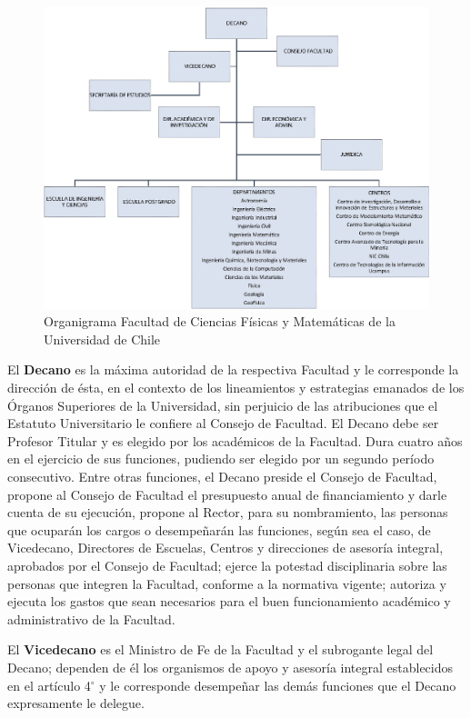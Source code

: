 \begin{figure}[ht!]
\centering
\includegraphics[width=\columnwidth]{./organigramas/organigrama_fcfm.eps}
\caption{Organigrama Facultad de Ciencias Físicas y Matemáticas de la Universidad de Chile}
\label{ograma_fcfm}
\end{figure}

El \textbf{Decano} es la máxima autoridad de la respectiva Facultad y le corresponde la dirección
de ésta, en el contexto de los lineamientos y estrategias emanados de los Órganos Superiores
de la Universidad, sin perjuicio de las atribuciones que el Estatuto Universitario le confiere al
Consejo de Facultad. El Decano debe ser Profesor Titular y es elegido por los académicos de la
Facultad. Dura cuatro años en el ejercicio de sus funciones, pudiendo ser elegido por un segundo
período consecutivo. Entre otras funciones, el Decano preside el Consejo de Facultad, propone
al Consejo de Facultad el presupuesto anual de financiamiento y darle cuenta de su ejecución,
propone al Rector, para su nombramiento, las personas que ocuparán los cargos o desempeñarán
las funciones, según sea el caso, de Vicedecano, Directores de Escuelas, Centros y direcciones de
asesoría integral, aprobados por el Consejo de Facultad; ejerce la potestad disciplinaria sobre las
personas que integren la Facultad, conforme a la normativa vigente; autoriza y ejecuta los gastos
que sean necesarios para el buen funcionamiento académico y administrativo de la Facultad.

El \textbf{Vicedecano} es el Ministro de Fe de la Facultad y el subrogante legal del Decano; dependen
de él los organismos de apoyo y asesoría integral establecidos en el artículo 4$^{\circ}$ y le corresponde
desempeñar las demás funciones que el Decano expresamente le delegue.

